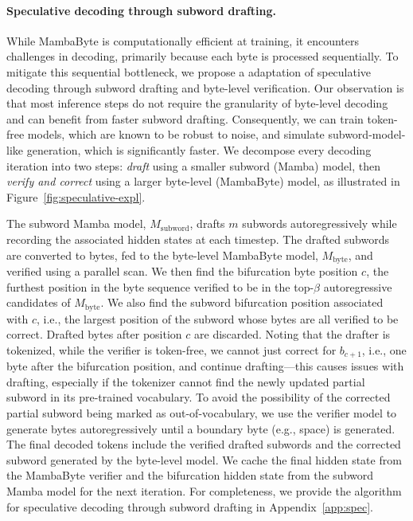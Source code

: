 \paragraph{Speculative decoding through subword drafting.} While MambaByte is computationally efficient at training, it encounters challenges in decoding, primarily because each byte is processed sequentially. To mitigate this sequential bottleneck, we propose a adaptation of speculative decoding through subword drafting and byte-level verification. Our observation is that most inference steps do not require the granularity of byte-level decoding and can benefit from faster subword drafting. Consequently, we can train token-free models, which are known to be robust to noise, and simulate subword-model-like generation, which is significantly faster. We decompose every decoding iteration into two steps: \textit{draft} using a smaller subword (Mamba) model, then \textit{verify and correct} using a larger byte-level (MambaByte) model, as illustrated in Figure~\ref{fig:speculative-expl}.

The subword Mamba model, $M_\text{subword}$, drafts $m$ subwords autoregressively while recording the associated hidden states at each timestep. The drafted subwords are converted to bytes, fed to the byte-level MambaByte model, $M_\text{byte}$, and verified using a parallel scan. We then find the bifurcation byte position $c$, the furthest position in the byte sequence verified to be in the top-$\beta$ autoregressive candidates of $M_\text{byte}$. We also find the subword bifurcation position associated with $c$, i.e., the largest position of the subword whose bytes are all verified to be correct. Drafted bytes after position $c$ are discarded. Noting that the drafter is tokenized, while the verifier is token-free, we cannot just correct for $b_{c+1}$, i.e., one byte after the bifurcation position, and continue drafting---this causes issues with drafting, especially if the tokenizer cannot find the newly updated partial subword in its pre-trained vocabulary. To avoid the possibility of the corrected partial subword being marked as out-of-vocabulary, we use the verifier model to generate bytes autoregressively until a boundary byte (e.g., space) is generated. The final decoded tokens include the verified drafted subwords and the corrected subword generated by the byte-level model. We cache the final hidden state from the MambaByte verifier and the bifurcation hidden state from the subword Mamba model for the next iteration. For completeness, we provide the algorithm for speculative decoding through subword drafting in Appendix~\ref{app:spec}.

